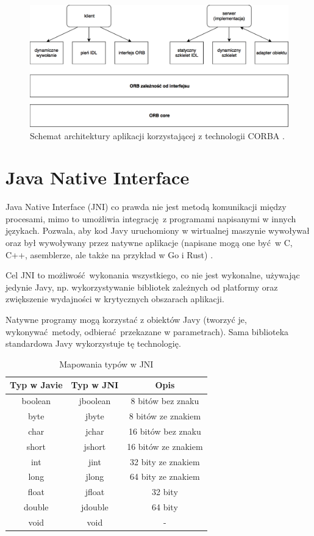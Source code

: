 \begin{figure}[h]
    \centering
    \includegraphics[width=\textwidth,height=\textheight,keepaspectratio]{img/CORBA_architecture.png}
    \caption{Schemat architektury aplikacji korzystającej z technologii CORBA \cite{Saw02}.}
    \label{fig:CORBA_architecture}
\end{figure}


\section{Java Native Interface}

Java Native Interface (JNI) co prawda nie jest metodą komunikacji między procesami, mimo to umożliwia integrację z programami napisanymi w innych językach. Pozwala, aby kod Javy uruchomiony w wirtualnej maszynie wywoływał oraz był wywoływany przez natywne aplikacje (napisane mogą one być w C, C++, asemblerze, ale także na przykład w Go i Rust) \cite{JNI17}.

Cel JNI to możliwość wykonania wszystkiego, co nie jest wykonalne, używając jedynie Javy, np. wykorzystywanie bibliotek zależnych od platformy oraz zwiększenie wydajności w krytycznych obszarach aplikacji.

Natywne programy mogą korzystać z obiektów Javy (tworzyć je, wykonywać metody, odbierać przekazane w parametrach). Sama biblioteka standardowa Javy wykorzystuje tę technologię.

\begin{table}[h!]
  \centering
  \begin{tabular}{|c|c|c|}
    \hline
    \textbf{Typ w Javie} & \textbf{Typ w JNI} & \textbf{Opis} \\ [0.5ex]
    \hline
    boolean & jboolean & 8 bitów bez znaku \\
    byte & jbyte & 8 bitów ze znakiem \\
    char & jchar & 16 bitów bez znaku \\
    short & jshort & 16 bitów ze znakiem \\
    int & jint & 32 bity ze znakiem \\
    long & jlong & 64 bity ze znakiem \\
    float & jfloat & 32 bity \\
    double & jdouble & 64 bity \\
    void & void & - \\ [1ex]
    \hline
  \end{tabular}
  \caption{Mapowania typów w JNI}
\end{table}


